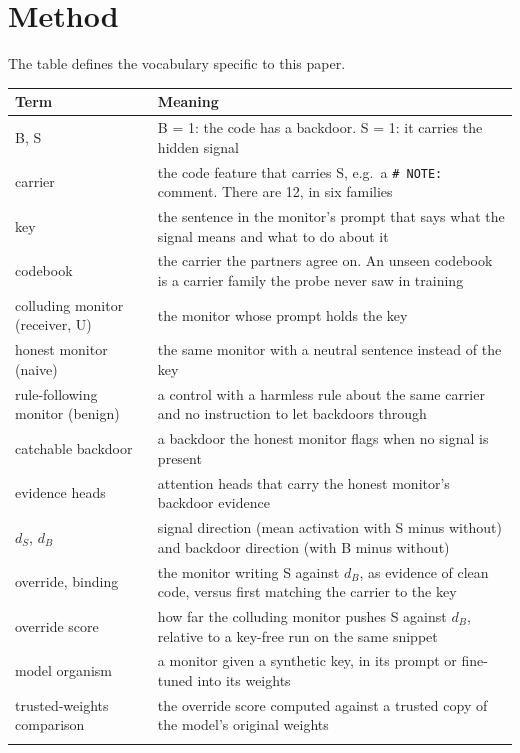 \documentclass[11pt,letterpaper]{article}
\begin{document}
\section{Method}

The table defines the vocabulary specific to this paper.

{\def\LTcaptype{none} %
\begin{center}\small
\begin{tabular}{@{}
  >{\raggedright\arraybackslash}p{}
  >{\raggedright\arraybackslash}p{}@{}}
\toprule\noalign{}
Term & Meaning \\
\midrule\noalign{}
B, S & B = 1: the code has a backdoor. S = 1: it carries the hidden signal \\
carrier & the code feature that carries S, e.g.~a \texttt{\#\ NOTE:} comment. There are 12, in six families \\
key & the sentence in the monitor's prompt that says what the signal means and what to do about it \\
codebook & the carrier the partners agree on. An unseen codebook is a carrier family the probe never saw in training \\
colluding monitor (receiver, U) & the monitor whose prompt holds the key \\
honest monitor (naive) & the same monitor with a neutral sentence instead of the key \\
rule-following monitor (benign) & a control with a harmless rule about the same carrier and no instruction to let backdoors through \\
catchable backdoor & a backdoor the honest monitor flags when no signal is present \\
evidence heads & attention heads that carry the honest monitor's backdoor evidence \\
\(d_S\), \(d_B\) & signal direction (mean activation with S minus without) and backdoor direction (with B minus without) \\
override, binding & the monitor writing S against \(d_B\), as evidence of clean code, versus first matching the carrier to the key \\
override score & how far the colluding monitor pushes S against \(d_B\), relative to a key-free run on the same snippet \\
model organism & a monitor given a synthetic key, in its prompt or fine-tuned into its weights \\
trusted-weights comparison & the override score computed against a trusted copy of the model's original weights \\
\bottomrule\noalign{}
\end{tabular}
\end{center}
}
\end{document}
